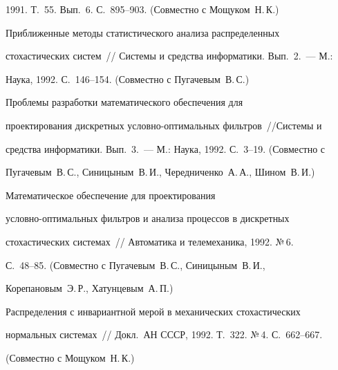 1991. Т.~55. Вып.~6. С.~895--903. (Совместно с Мощуком~Н.\,К.)


\vspace*{-6pt}










 Приближенные методы статистического анализа распределенных


стохастических систем~// Системы и средства информатики. Вып.~2.~--- М.:


Наука, 1992. С.~146--154. (Совместно с Пугачевым~В.\,С.)





 Проблемы разработки математического обеспечения для


проектирования дискретных услов\-но-оп\-ти\-маль\-ных фильтров~//\linebreak Системы и


средства информатики. Вып.~3.~--- М.: Наука, 1992. С.~3--19. (Совместно с


Пугачевым~В.\,С., Синицыным~В.\,И., Чередниченко~А.\,А., Шином~В.\,И.)





 Математическое обеспечение для проектирования


 услов\-но-оп\-ти\-маль\-ных фильтров и анализа процессов в дискретных


стохастических системах~// Автоматика и телемеханика, 1992. №\,6.


 С.~48--85. (Совместно с Пугачевым~В.\,С., Синицыным~В.\,И.,


Корепановым~Э.\,Р., Хатунцевым~А.\,П.)





 Распределения с инвариантной мерой в механических стохастических


нормальных системах~// Докл.\ АН СССР, 1992. Т.~322. №\,4. С.~662--667.


(Совместно с Мощуком~Н.\,К.)











